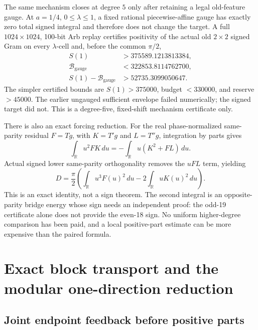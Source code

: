\documentclass[11pt]{article}
\theoremstyle{definition}
\theoremstyle{remark}
\newcommand{\R}{\mathbb{R}}
\begin{document}
The same mechanism closes at degree $5$ only after retaining a legal
old-feature gauge. At $a=1/4$, $0\le\lambda\le1$, a fixed rational
piecewise-affine gauge has exactly zero total signed integral and therefore
does not change the target. A full $1024\times1024$, 100-bit Arb replay
certifies positivity of the actual old $2\times2$ signed Gram on every
$\lambda$-cell and, before the common $\pi/2$,
\begin{align}
 S(1)&>375589.1213813384,\nonumber\\
 \mathcal B_{\mathrm{gauge}}&<322853.8114762700,\nonumber\\
 S(1)-\mathcal B_{\mathrm{gauge}}&>52735.3099050647.
 \label{eq:paid-newman-n5}
\end{align}
The simpler certified bounds are $S(1)>375000$, budget $<330000$, and reserve
$>45000$. The earlier ungauged sufficient envelope failed numerically; the
signed target did not. This is a degree-five, fixed-shift mechanism certificate
only.

There is also an exact forcing reduction. For the real phase-normalized
same-parity residual $F=Tg$, with $K=T'g$ and $L=T''g$, integration by parts
gives
\begin{equation}
 \int_{\R}u^2FK\,du=-\int_{\R}u(K^2+FL)\,du.
\end{equation}
Actual signed lower same-parity orthogonality removes the $uFL$ term, yielding
\begin{equation}
 D=\frac{\pi}{2}\left(
     \int_{\R}u^3F(u)^2\,du
     -2\int_{\R}uK(u)^2\,du
   \right).
 \label{eq:orthogonality-forcing}
\end{equation}
This is an exact identity, not a sign theorem. The second integral is an
opposite-parity bridge energy whose sign needs an independent proof: the
odd-19 certificate alone does not provide the even-18 sign. No uniform
higher-degree comparison has been paid, and a local positive-part estimate can
be more expensive than the paired formula.

\section{Exact block transport and the modular one-direction reduction}

\subsection{Joint endpoint feedback before positive parts}
\end{document}
